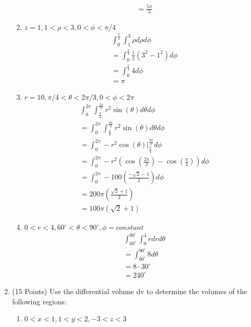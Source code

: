 \documentclass{article}
\begin{document}
\begin{enumerate}
\begin{enumerate}
\begin{align}
            &=\boxed{\frac{5\pi}{3}} 
        \end{align}
        \item $z = 1, 1 < \rho < 3, 0 < \phi < \pi/4$
        \begin{align}
            &\int_0^{\frac{\pi}{4}}\int_1^3\rho d\rho d\phi\\
            &=\int_0^{\frac{\pi}{4}}\frac{1}{2}(3^2-1^2)d\phi\\
            &=\int_0^{\frac{\pi}{4}}4 d\phi\\
            &= \boxed{\pi}
        \end{align}                                                         
        \item $r = 10, \pi/4 < \theta < 2\pi/3, 0 < \phi < 2\pi$
        \begin{align}
            &\int_0^{2\pi}\int_\frac{\pi}{4}^{\frac{2\pi}{3}}r^2\sin(\theta)d\theta d\phi\\
            &=\int_0^{2\pi}\int_\frac{\pi}{4}^{\frac{2\pi}{3}}r^2\sin(\theta)d\theta d\phi\\
            &=\int_0^{2\pi}-r^2\cos(\theta)\bigg|_\frac{\pi}{4}^{\frac{2\pi}{3}}d\phi\\
            &=\int_0^{2\pi}-r^2(\cos(\frac{2\pi}{3})-\cos(\frac{\pi}{4}))d\phi\\
            &=\int_0^{2\pi}-100\left(\frac{-\sqrt{2}-1}{2}\right)d\phi\\
            &=200\pi\left(\frac{\sqrt{2}+1}{2}\right)\\
            &= \boxed{100\pi(\sqrt{2} + 1)}
        \end{align}
        \item $0 < r < 4, 60^\circ < \theta < 90^\circ, \phi =  constant$
        \begin{align}
            &\int_{60^\circ}^{90^\circ}\int_0^4 rdrd\theta\\
            &=\int_{60^\circ}^{90^\circ} 8d\theta\\
            &=8\cdot30^\circ\\
            &=\boxed{240^\circ}
        \end{align}
    \end{enumerate}
    \newpage
    \item (15 Points) Use the differential volume dv to determine the volumes of the following regions:
    \begin{enumerate}
        \item $0 < x < 1, 1 < y < 2, -3 < z < 3$
        \begin{align}

\end{align}
\end{enumerate}
\end{enumerate}
\end{document}

